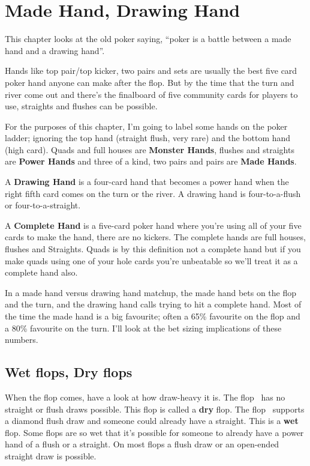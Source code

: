 \chapter{Made Hand, Drawing Hand}


This chapter looks at the old poker saying, ``poker
is a battle between a made hand and a drawing hand''.

Hands like top pair/top kicker, two pairs and sets
are usually the best five card poker hand anyone can
make after the flop. But by the time that the turn and river come out
and there's the finalboard of five community cards for players to use,
straights and flushes can be possible.

For the purposes of this chapter, I'm going to label some hands on the
poker ladder; ignoring the top hand (straight flush, very rare) and
the bottom hand (high card). Quads and full houses are \textbf{Monster
Hands}, flushes and straights are \textbf{Power Hands} and three of a
kind, two pairs and pairs are \textbf{Made Hands}.

A \textbf{Drawing Hand} is a four-card hand that becomes a power hand
when the right fifth card comes on the turn or the river. A drawing hand
is four-to-a-flush or four-to-a-straight.

A \textbf{Complete Hand} is a five-card poker hand where
you're using all of your five cards to make the hand, there are no
kickers. The complete hands are full houses, flushes and
Straights. Quads is by this definition not a complete hand
but if you make quads using one of your hole cards you're
unbeatable so we'll treat it as a complete hand also.


In a made hand versus drawing hand matchup, the made hand bets on the
flop and the turn, and the drawing hand calls trying to hit a
complete hand. Most of the time the made hand is a big favourite;
often a 65\% favourite on the flop and a 80\% favourite on the
turn. I'll look at the bet sizing implications of these numbers.

\section{Wet flops, Dry flops}

When the flop comes, have a look at how draw-heavy it is. The flop 
\Ks\eigh\trec\ has no straight or flush draws possible. This flop is
called a \textbf{dry} flop. The flop \Jd\tend\eigs\ supports a diamond
flush draw and someone could already have a straight. This is a
\textbf{wet} flop. Some flops are so wet that it's possible for
someone to already have a power hand of a flush or a straight. On most
flops a flush draw or an open-ended straight draw is possible.

